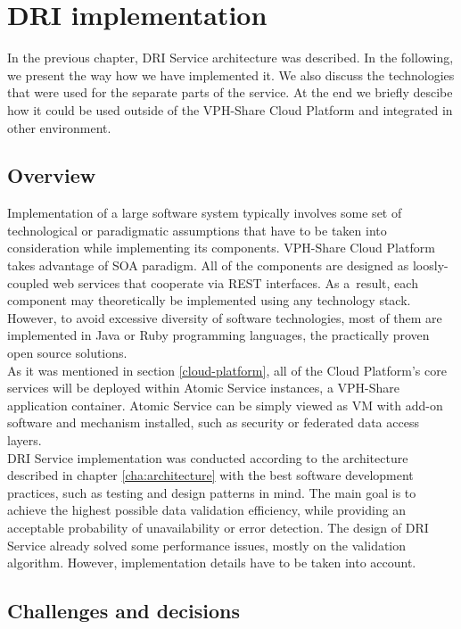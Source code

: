 \chapter{DRI implementation}
\label{cha:implementation}
In the previous chapter, DRI Service architecture was described. In the
following, we present the way how we have implemented it. We also
discuss the technologies that were used for the separate parts of the service.
At the end we briefly descibe how it could be used outside of the VPH-Share
Cloud Platform and integrated in other environment.


\section{Overview}
Implementation of a large software system typically involves some set of
technological or paradigmatic assumptions that have to be taken into
consideration while implementing its components. VPH-Share Cloud Platform takes
advantage of SOA paradigm. All of the components are designed as loosly-coupled web
services that cooperate via REST interfaces. As a~result, each component may
theoretically be implemented using any technology stack. However, to avoid
excessive diversity of software technologies, most of them are implemented in
Java or Ruby programming languages, the practically proven open source
solutions.\\

As it was mentioned in section \ref{cloud-platform}, all of the Cloud
Platform's core services will be deployed within Atomic Service instances,
a VPH-Share application container. Atomic Service can be simply viewed as VM
with add-on software and mechanism installed, such as security or federated
data access layers.\\

DRI Service implementation was conducted according to the architecture
described in chapter \ref{cha:architecture} with the best software development
practices, such as testing and design patterns in mind. The main goal is to
achieve the highest possible data validation efficiency, while providing an
acceptable probability of unavailability or error detection. The design of DRI
Service already solved some performance issues, mostly on the validation
algorithm. However, implementation details have to be taken into account.
	
\section{Challenges and decisions}


